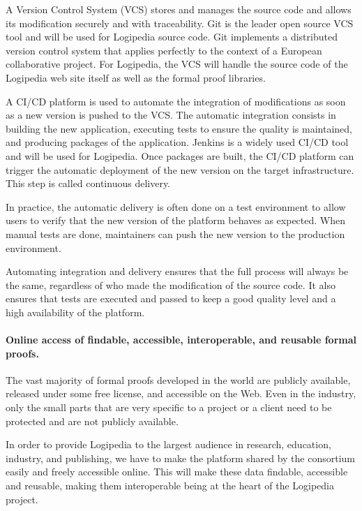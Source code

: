\begin{compactitem}
\item
A Version Control System (VCS) stores and manages the source code and
allows its modification securely and with traceability. Git is the leader
open source VCS tool and will be used for Logipedia source code. Git implements
a distributed version control system that applies perfectly to the context of
a European collaborative project. For Logipedia, the VCS will handle the
source code of the Logipedia web site itself as well as the formal proof libraries.
\item
A CI/CD platform is used to automate the integration of modifications
as soon as a new version is pushed to the VCS. The automatic integration
consists in building the new application, executing tests to ensure
the quality is maintained, and producing packages of the application.
Jenkins is a widely used CI/CD tool and will be used for Logipedia.
Once packages are built, the CI/CD platform can trigger the automatic
deployment of the new version on the target infrastructure.
This step is called continuous delivery.
\end{compactitem}

In practice, the automatic delivery is often done on a test environment
to allow users to verify that the new version of the platform
behaves as expected. When manual tests are done, maintainers can push
the new version to the production environment.

Automating integration and delivery ensures that the full process
will always be the same, regardless of who made the modification
of the source code. It also ensures that tests are executed and passed
to keep a good quality level and a high availability of the platform.

\paragraph*{Online access of findable, accessible, interoperable, and
reusable formal proofs.}

The vast majority of formal proofs developed in the world are publicly
available, released under some free license, and accessible on the
Web. Even in the industry, only the small parts that are very specific
to a project or a client need to be protected and are not publicly
available.

In order to provide Logipedia to the largest audience in research,
education, industry, and publishing, we have to make the platform
shared by the consortium easily and freely accessible online. This
will make these data findable, accessible and reusable,
making them interoperable being at the heart of the Logipedia project.

